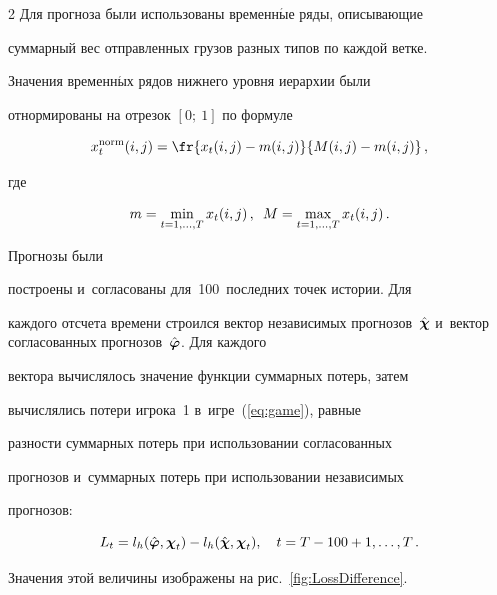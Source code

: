 \begin{multicols}{2}
Для прогноза были использованы временн$\acute{\mbox{ы}}$е ряды, описывающие

суммарный вес отправленных грузов разных типов по каждой ветке.

Значения временн$\acute{\mbox{ы}}$х рядов нижнего уровня иерархии были

отнормированы на отрезок $[0;~1]$ по формуле

\begin{equation*}

    x_t^{\mathrm{norm}}(i, j) = \fr{x_t(i, j) - m(i, j)}{M(i, j) - m(i,

    j)}\,,

    \end{equation*}

    где

    $$

    m = \min\limits_{t = 1, \ldots, T} x_t(i, j)\,, \enskip

    M = \max\limits_{t = 1, \ldots, T} x_t(i, j)\,.

$$



 Прогнозы были

построены и~согласованы для~100~последних точек истории. Для

каждого отсчета времени строился вектор независимых прогнозов~$\hat{\boldsymbol{\chi}}$ и~вектор согласованных прогнозов~$\hat{\boldsymbol{\varphi}}$. Для каждого

вектора вычислялось значение функции суммарных потерь, затем

вычислялись потери игрока~1 в~игре~(\ref{eq:game}), равные

разности суммарных потерь при использовании согласованных

прогнозов и~суммарных потерь при использовании независимых

прогнозов:

$$

    L_t = l_h(\hphi, \boldsymbol{\chi}_t) - l_h(\hchi, \boldsymbol{\chi}_t),

    \quad t = T -

    100 + 1, \ldots, T\,.

$$

Значения этой величины изображены на рис.~\ref{fig:LossDifference}.




\end{multicols}
